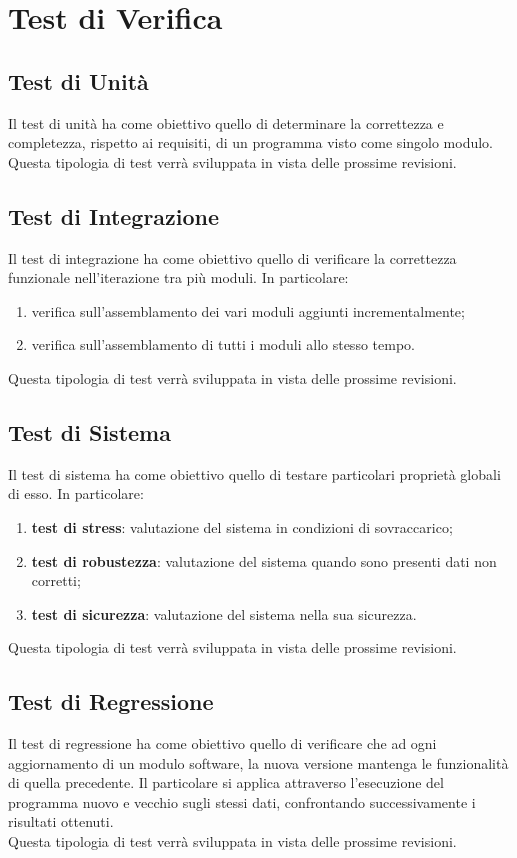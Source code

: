 \section{Test di Verifica}

\subsection{Test di Unità}
Il test di unità ha come obiettivo quello di determinare la correttezza e completezza, rispetto ai requisiti, di un programma visto come singolo modulo.\\
Questa tipologia di test verrà sviluppata in vista delle prossime revisioni.


\subsection{Test di Integrazione}
Il test di integrazione ha come obiettivo quello di verificare la correttezza funzionale nell’iterazione tra più moduli. In particolare:
\begin{enumerate}
	\item verifica sull'assemblamento dei vari moduli aggiunti incrementalmente;
	\item verifica sull'assemblamento di tutti i moduli allo stesso tempo.
\end{enumerate}
Questa tipologia di test verrà sviluppata in vista delle prossime revisioni.


\subsection{Test di Sistema}
Il test di sistema ha come obiettivo quello di testare particolari proprietà globali di esso. In particolare:
\begin{enumerate}
	\item \textbf{test di stress}: valutazione del sistema in condizioni di sovraccarico;
	\item \textbf{test di robustezza}: valutazione del sistema quando sono presenti dati non corretti;
	\item \textbf{test di sicurezza}: valutazione del sistema nella sua sicurezza.
\end{enumerate}
Questa tipologia di test verrà sviluppata in vista delle prossime revisioni.


\subsection{Test di Regressione}
Il test di regressione ha come obiettivo quello di verificare che ad ogni aggiornamento di un modulo software, la nuova versione mantenga le funzionalità di quella precedente.
Il particolare si applica attraverso l'esecuzione del programma nuovo e vecchio sugli stessi dati, confrontando successivamente i risultati ottenuti.\\
Questa tipologia di test verrà sviluppata in vista delle prossime revisioni.